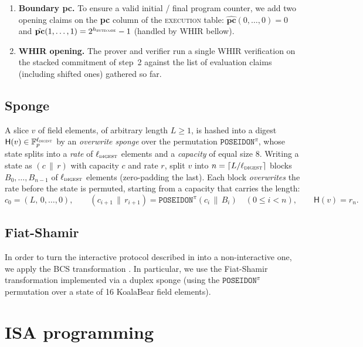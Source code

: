 \documentclass{article}
\theoremstyle{definition}
\newcommand{\Fp}{\mathbb F_p}
\newcommand{\diglen}{{\ell_{\textsc{digest}}}} %
\begin{document}
\begin{enumerate}
    \item \textbf{Boundary pc.} To ensure a valid initial / final program counter, we add two opening claims on the \textbf{pc} column of the \textsc{execution} table: $\hat{\textbf{pc}}(0, \ldots, 0) = 0$ and $\hat{\textbf{pc}}(1, \ldots, 1) = 2^{h_\textsc{bytecode}} - 1$ (handled by WHIR bellow).

    \item \textbf{WHIR opening.} The prover and verifier run a single WHIR verification on the stacked commitment of step~2 against the list of evaluation claims (including shifted ones) gathered so far.

\end{enumerate}

\subsection{Sponge}\label{sec:sponge}

A slice $v$ of field elements, of arbitrary length $L \ge 1$, is hashed into a digest $\mathsf{H}(v) \in \Fp^\diglen$ by an \emph{overwrite sponge} over the permutation $\texttt{POSEIDON}^\pi$, whose state splits into a \emph{rate} of $\diglen$ elements and a \emph{capacity} of equal size $8$. Writing a state as $(c \,\|\, r)$ with capacity $c$ and rate $r$, split $v$ into $n = \lceil L / \diglen \rceil$ blocks $B_0, \dots, B_{n-1}$ of $\diglen$ elements (zero-padding the last). Each block \emph{overwrites} the rate before the state is permuted, starting from a capacity that carries the length:
$$c_0 = (L,\, 0, \dots, 0), \qquad (c_{i+1} \,\|\, r_{i+1}) = \texttt{POSEIDON}^\pi(c_i \,\|\, B_i) \quad (0 \le i < n), \qquad \mathsf{H}(v) = r_n.$$


\subsection{Fiat-Shamir}

In order to turn the interactive protocol described in  into a non-interactive one, we apply the BCS transformation \cite{BCS}. In particular, we use the Fiat-Shamir transformation implemented via a duplex sponge \cite{fiat_shamir_duplex_sponge} (using the $\texttt{POSEIDON}^\pi$ permutation over a state of 16 KoalaBear field elements).

\section{ISA programming}
\end{document}
